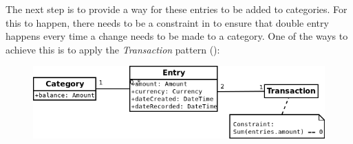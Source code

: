 The next step is to provide a way for these entries to be added to categories.
For this to happen, there needs to be a constraint in to ensure that double
entry happens every time a change needs to be made to a category. One of the
ways to achieve this is to apply the \emph{Transaction} pattern (\cite[][Section~6.2]{fowler1997analysis}):
\begin{figure}[ht!]
  \begin{center}
    \includegraphics[width=14cm]{./contents/img/Class_Diagram_-_Transaction.png}
  \end{center}
\end{figure}
\FloatBarrier

